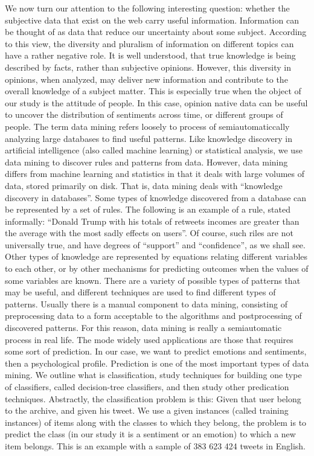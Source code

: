 \documentclass{acmtog} %
\begin{document}
We now turn our attention to the following interesting question: whether the subjective data that exist on the web carry useful information. Information can be thought of as data that reduce our uncertainty about some subject. According to this view, the diversity and pluralism of information on different topics can have a rather negative role. It is well understood, that true knowledge is being described by facts, rather than subjective opinions. However, this diversity in opinions, when analyzed, may deliver new information and contribute to the overall knowledge of a subject matter. This is especially true when the object of our study is the attitude of people. In this case, opinion native data can be useful to uncover the distribution of sentiments across time, or different groups of people.
The term data mining refers loosely to process of semiautomaticcally analyzing large databases to find useful patterns. Like knowledge discovery in artificial intelligence (also called machine learning) or statistical analysis, we use data mining to discover rules and patterns from data. However, data mining differs from machine learning and statistics in that it deals with large volumes of data, stored primarily on disk. That is, data mining deals with “knowledge discovery in databases”. Some types of knowledge discovered from a database can be represented by a set of rules. The following is an example of a rule, stated informally: “Donald Trump with his totals of retweets incomes are greater than the average with the most sadly effects on users”. Of course, such riles are not universally true, and have degrees of “support” and “confidence”, as we shall see. Other types of knowledge are represented by equations relating different variables to each other, or by other mechanisms for predicting outcomes when the values of some variables are known. There are a variety of possible types of patterns that may be useful, and different techniques are used to find different types of patterns. Usually there is a manual component to data mining, consisting of preprocessing data to a form acceptable to the algorithms and postprocessing of discovered patterns. For this reason, data mining is really a semiautomatic process in real life. The mode widely used applications are those that requires some sort of prediction. In our case, we want to predict emotions and sentiments, then a psychological profile. Prediction is one of the most important types of data mining. We outline what is classification, study techniques for building one type of classifiers, called decision-tree classifiers, and then study other predication techniques. Abstractly, the classification problem is this: Given that user belong to the archive, and given his tweet. We use a given instances (called training instances) of items along with the classes to which they belong, the problem is to predict the class (in our study it is a sentiment or an emotion) to which a new item belongs.
This is an example with a sample of 383 623 424 tweets in English.
\end{document}
